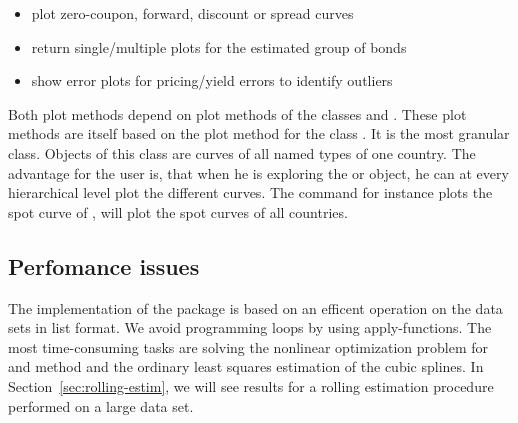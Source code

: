 \begin{itemize}
\item plot zero-coupon, forward, discount or spread curves
\item return single/multiple plots for the estimated group of bonds
\item show error plots for pricing/yield errors to identify outliers
\end{itemize}

Both plot methods depend on plot methods of the classes  and . These plot methods are itself based on the plot method for the class . It is the most granular class. Objects of this class are curves of all named types of one country. The advantage for the user is, that when he
is exploring the  or  object, he can at every hierarchical level plot the different curves. 
The command  for instance plots the spot curve of ,  will plot the spot curves of all countries. 


\subsection{Perfomance issues}
\label{sec:perfomance-issues}

The implementation of the  package is based on an efficent operation on the data sets in list format. We avoid programming loops by using apply-functions. The most time-consuming tasks are solving the nonlinear optimization problem for \cite{Nelson1987} and \cite{Svensson1994} method and the ordinary least squares estimation of the \cite{McCulloch1975} cubic splines. In Section~\ref{sec:rolling-estim}, we will see results for a rolling estimation procedure performed on a large data set.


